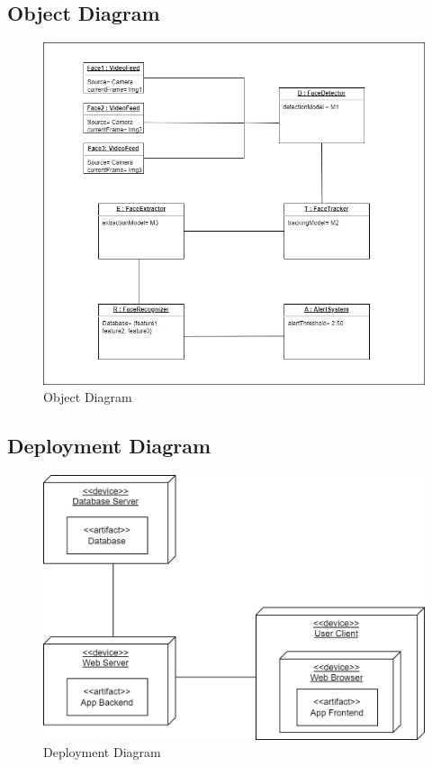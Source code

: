 	\subsection{Object Diagram}
		\begin{figure}[h!]
			\includegraphics[width=\textwidth]{components/images/object.png}
			\caption{Object Diagram}
			\label{fig:object}
		\end{figure}
		\pagebreak

	\subsection{Deployment Diagram}
		\begin{figure}[h!]
			\includegraphics[width=\textwidth]{components/images/deployment.jpeg}
			\caption{Deployment Diagram}
			\label{fig:deployment}
		\end{figure}